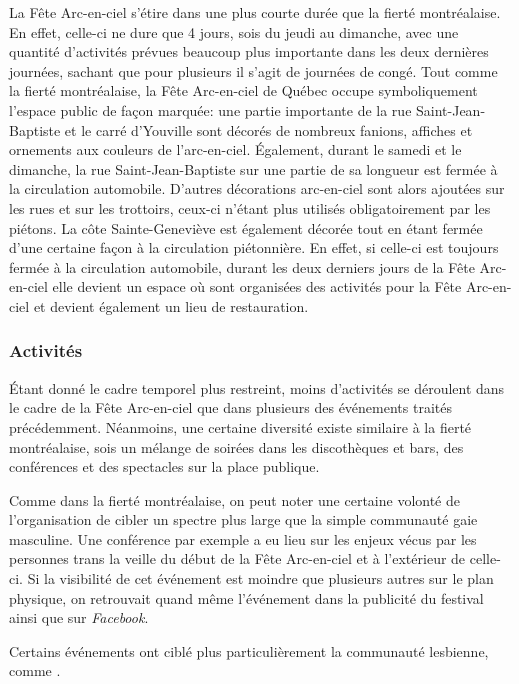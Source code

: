 La Fête Arc-en-ciel s'étire dans une plus courte durée que la fierté montréalaise.
En effet, celle-ci ne dure que 4 jours, sois du jeudi au dimanche, avec une quantité d'activités prévues beaucoup plus importante dans les deux dernières journées, sachant que pour plusieurs il s'agit de journées de congé.
Tout comme la fierté montréalaise, la Fête Arc-en-ciel de Québec occupe symboliquement l'espace public de façon marquée: une partie importante de la rue Saint-Jean-Baptiste et le carré d'Youville sont décorés de nombreux fanions, affiches et ornements aux couleurs de l'arc-en-ciel.
Également, durant le samedi et le dimanche, la rue Saint-Jean-Baptiste sur une partie de sa longueur est fermée à la circulation automobile.
D'autres décorations arc-en-ciel sont alors ajoutées sur les rues et sur les trottoirs, ceux-ci n'étant plus utilisés obligatoirement par les piétons.
La côte Sainte-Geneviève est également décorée tout en étant fermée d'une certaine façon à la circulation piétonnière.
En effet, si celle-ci est toujours fermée à la circulation automobile, durant les deux derniers jours de la Fête Arc-en-ciel elle devient un espace où sont organisées des activités pour la Fête Arc-en-ciel et devient également un lieu de restauration.

\subsubsection{Activités}
\label{subsec:activitesfetearcenciel}
Étant donné le cadre temporel plus restreint, moins d'activités se déroulent dans le cadre de la Fête Arc-en-ciel que dans plusieurs des événements traités précédemment.
Néanmoins, une certaine diversité existe similaire à la fierté montréalaise, sois un mélange de soirées dans les discothèques et bars, des conférences et des spectacles sur la place publique.

Comme dans la fierté montréalaise, on peut noter une certaine volonté de l'organisation de cibler un spectre plus large que la simple communauté gaie masculine.
Une conférence par exemple a eu lieu sur les enjeux vécus par les personnes trans la veille du début de la Fête Arc-en-ciel et à l'extérieur de celle-ci.
Si la visibilité de cet événement est moindre que plusieurs autres sur le plan physique, on retrouvait quand même l'événement dans la publicité du festival ainsi que sur \emph{Facebook}.

Certains événements ont ciblé plus particulièrement la communauté lesbienne, comme .

